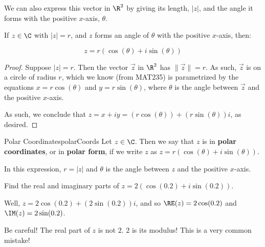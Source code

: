 We can also express this vector in $\R^2$ by giving its length, $|z|$, and the angle it forms with the positive $x$-axis, $\theta$.

\begin{lem} If $z\in \C$ with $|z| = r$, and $z$ forms an angle of $\theta$ with the positive $x$-axis, then:

$$z = r(\cos(\theta) + i\sin(\theta))$$
\end{lem}

\begin{proof} Suppose $|z| = r$. Then the vector $\vec{z}$ in $\R^2$ has $\lVert \vec{z}\rVert = r$. As such, $\vec{z}$ is on a circle of radius $r$, which we know (from MAT235) is parametrized by the equations $x = r\cos(\theta)$ and $y = r\sin(\theta)$, where $\theta$ is the angle between $\vec{z}$ and the positive $x$-axis.

As such, we conclude that $z = x + iy = (r\cos(\theta)) + (r\sin(\theta))i$, as desired.
\end{proof}


\begin{defbo}{Polar Coordinates}{polarCoords}
 Let $z\in \C$. Then we say that $z$ is in {\bf polar coordinates}, or in {\bf polar form}, if we write $z$ as $z = r(\cos(\theta) + i\sin(\theta))$.

In this expression, $r = |z|$ and $\theta$ is the angle between $z$ and the positive $x$-axis.
\end{defbo}

\begin{ex}{}{} Find the real and imaginary parts of $z = 2(\cos(0.2) + i\sin(0.2))$.

Well, $z = 2\cos(0.2) + (2\sin(0.2))i$, and so $\RE(z) = 2\cos(0.2)$ and $\IM(z) = 2\sin(0.2)$.

\end{ex}

\begin{note} Be careful! The real part of $z$ is not $2$. $2$ is its modulus! This is a very common mistake!\end{note}


